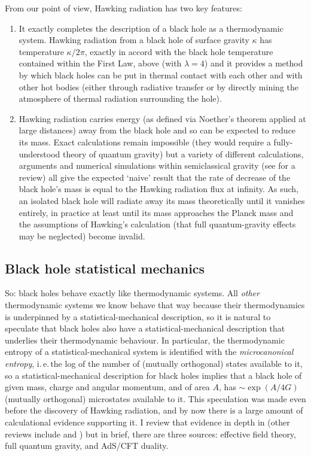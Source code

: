 \documentclass{article}
\newcommand{\iec}{\mbox{i.\,e.\,}}
\begin{document}
From our point of view, Hawking radiation has two key features:
\begin{enumerate}
\item It exactly completes the description of a black hole as a thermodynamic system. Hawking radiation from a black hole of surface gravity $\kappa$ has temperature $\kappa/2\pi$, exactly in accord with the black hole temperature contained within the First Law, above (with $\lambda=4$) and it provides a method by which black holes can be put in thermal contact with each other and with other hot bodies (either through radiative transfer or by directly mining the atmosphere of thermal radiation surrounding the hole). 
\item Hawking radiation carries energy (as defined via Noether's theorem applied at large distances) away from the black hole and so can be expected to reduce its mass. Exact calculations remain impossible (they would require a fully-understood theory of quantum gravity) but a variety of different calculations, arguments and numerical simulations within semiclassical gravity (see  for a review) all give the expected `naive' result that the rate of decrease of the black hole's mass is equal to the Hawking radiation flux at infinity. As such, an isolated black hole will radiate away its mass theoretically until it vanishes entirely, in practice at least until its mass approaches the Planck mass and the assumptions of Hawking's calculation (that full quantum-gravity effects may be neglected) become invalid.
\end{enumerate}

\subsection{Black hole statistical mechanics}\label{black-hole-stat-mech}

So: black holes behave exactly like thermodynamic systems. All \emph{other} thermodynamic systems we know behave that way because their thermodynamics is underpinned by a statistical-mechanical description, so it is natural to speculate that black holes also have a statistical-mechanical description that underlies their thermodynamic behaviour. In particular, the thermodynamic entropy of a statistical-mechanical system is identified with the \emph{microcanonical entropy}, \iec the log of the number of (mutually orthogonal) states available to it, so a statistical-mechanical description for black holes implies that a black hole of given mass, charge and angular momentum, and of area $A$, has $\sim \exp(A/4G)$ (mutually orthogonal) microstates available to it. This speculation was made even before the discovery of Hawking radiation, and by now there is a large amount of calculational evidence supporting it. I review that evidence in depth in  (other reviews include  and )  but in brief, there are three sources: effective field theory, full quantum gravity, and AdS/CFT duality.
\end{document}
